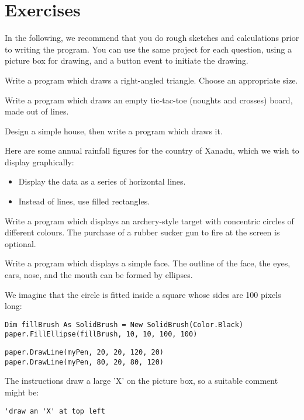	\section{Exercises}
		In the following, we recommend that you do rough sketches and calculations prior to writing the program. You can use the same project for each question, using a picture box for drawing, and a button event to initiate the drawing.

		\begin{enumChapter}
			\item Write a program which draws a right-angled triangle. Choose an appropriate size.
			\item Write a program which draws an empty tic-tac-toe (noughts and crosses) board, made out of lines.
			\item Design a simple house, then write a program which draws it.
			\item	Here are some annual rainfall figures for the country of Xanadu, which we wish to display graphically:

			\begin{itemize}
				\item Display the data as a series of horizontal lines.
				\item Instead of lines, use filled rectangles.
			\end{itemize}
		\item Write a program which displays an archery-style target with concentric circles of different colours. The purchase of a rubber sucker gun to fire at the screen is optional.
		\item Write a program which displays a simple face. The outline of the face, the eyes, ears, nose, and the mouth can be formed by ellipses.
		\end{enumChapter}


		\begin{stab}
			\begin{enumChapter}
				\item	We imagine that the circle is fitted inside a square whose sides are 100 pixels long:
					\begin{lstlisting}
Dim fillBrush As SolidBrush = New SolidBrush(Color.Black)
paper.FillEllipse(fillBrush, 10, 10, 100, 100)
					\end{lstlisting}
				\item 
					\begin{lstlisting}
paper.DrawLine(myPen, 20, 20, 120, 20)
paper.DrawLine(myPen, 80, 20, 80, 120)
					\end{lstlisting}
				\item The instructions draw a large 'X' on the picture box, so a suitable comment might be:
					\begin{lstlisting}
'draw an 'X' at top left
					\end{lstlisting}
			\end{enumChapter}
		\end{stab}
